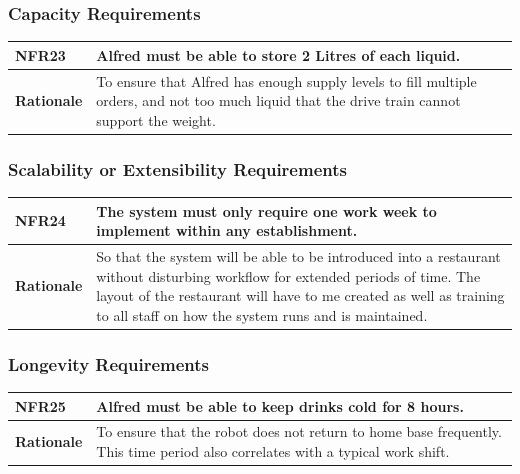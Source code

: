 \documentclass [11pt]{article}
\begin{document}
\subsubsection{Capacity Requirements }

\begin{longtable}{| p{ } | p{ } | }\hline 
\rowcolor{tableCell}\textbf{NFR23} &  Alfred must be able to store 2 Litres of each liquid. \\ \hline
\textbf{Rationale} & To ensure that Alfred has enough supply levels to fill multiple orders, and not too much liquid that the drive train cannot support the weight. \\ \hline
\end{longtable}

\subsubsection{Scalability or Extensibility Requirements }

\begin{longtable}{| p{ } | p{ } | }\hline 
\rowcolor{tableCell}\textbf{NFR24} &  The system must only require one work week to implement within any establishment. \\ \hline
\textbf{Rationale} & So that the system will be able to be introduced into a restaurant without disturbing workflow for extended periods of time. The layout of the restaurant will have to me created as well as training to all staff on how the system runs and is maintained.\\ \hline 
\end{longtable}
\subsubsection{Longevity Requirements }

\begin{longtable}{| p{ } | p{ } | }\hline 
\rowcolor{tableCell}\textbf{NFR25} &  Alfred must be able to keep drinks cold for 8 hours. \\ \hline
\textbf{Rationale} & To ensure that the robot does not return to home base frequently. This time period also correlates with a typical work shift.\\ \hline 
\end{longtable}
\end{document}
